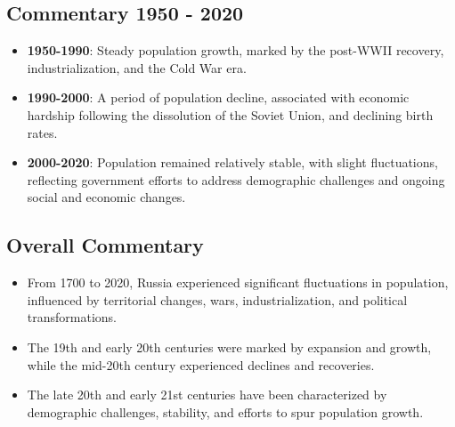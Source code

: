 \subsection*{Commentary 1950 - 2020}
\begin{itemize}
    \item \textbf{1950-1990}: Steady population growth, marked by the post-WWII recovery, industrialization, and the Cold War era.
    \item \textbf{1990-2000}: A period of population decline, associated with economic hardship following the dissolution of the Soviet Union, and declining birth rates.
    \item \textbf{2000-2020}: Population remained relatively stable, with slight fluctuations, reflecting government efforts to address demographic challenges and ongoing social and economic changes.
\end{itemize}

\subsection*{Overall Commentary}
\begin{itemize}
    \item From 1700 to 2020, Russia experienced significant fluctuations in population, influenced by territorial changes, wars, industrialization, and political transformations.
    \item The 19th and early 20th centuries were marked by expansion and growth, while the mid-20th century experienced declines and recoveries.
    \item The late 20th and early 21st centuries have been characterized by demographic challenges, stability, and efforts to spur population growth.
\end{itemize}
